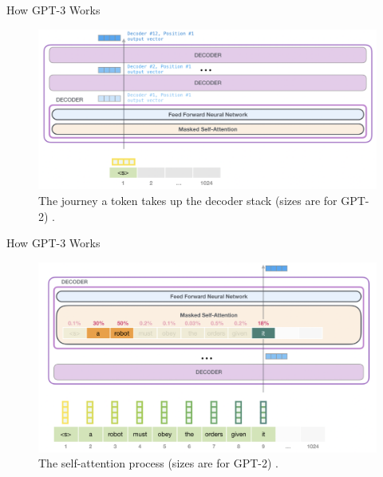 \documentclass{beamer}
\begin{document}
\begin{frame}{How GPT-3 Works}
    \begin{figure}
        \centering
        \includegraphics[scale=0.35]{gpt3_stack_journey}
        \caption{The journey a token takes up the decoder stack (sizes are for GPT-2) \cite{alammar2019}.}
        \label{fig:gpt3_stack_journey}
    \end{figure}
\end{frame}

\begin{frame}{How GPT-3 Works}
    \begin{figure}
        \centering
        \includegraphics[scale=0.35]{gpt3_self_attention1}
        \caption{The self-attention process (sizes are for GPT-2) \cite{alammar2019}.}
        \label{fig:gpt3_self_attention1}
    \end{figure}
\end{frame}
\end{document}
